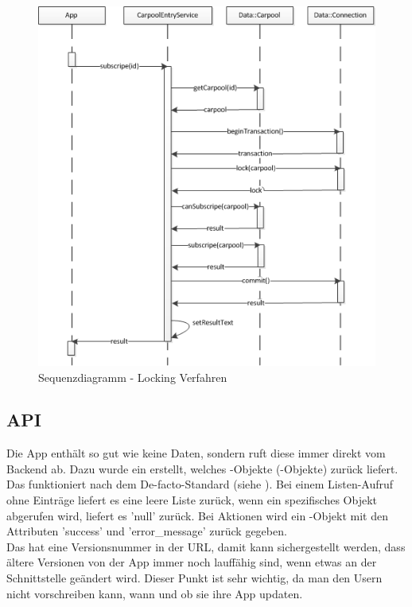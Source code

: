 \begin{figure}[h]
\centering
\includegraphics[scale=0.75]{images/visio/locking_verfahren.png}
\caption{Sequenzdiagramm - Locking Verfahren}
\label{fig:locking_verfahren}
\end{figure}

\FloatBarrier
\subsection{API}
Die App enthält so gut wie keine Daten, sondern ruft diese immer direkt vom Backend ab. Dazu wurde ein   erstellt, welches -Objekte (-Objekte) zurück liefert. Das  funktioniert nach dem De-facto-Standard (siehe \cite{wiki_restful}). Bei einem Listen-Aufruf ohne Einträge liefert es eine leere Liste zurück, wenn ein spezifisches Objekt abgerufen wird, liefert es 'null' zurück. Bei Aktionen wird ein -Objekt mit den Attributen 'success' und 'error\_message' zurück gegeben.\\

Das  hat eine Versionsnummer in der URL, damit kann sichergestellt werden, dass ältere Versionen von der App immer noch lauffähig sind, wenn etwas an der Schnittstelle geändert wird. Dieser Punkt ist sehr wichtig, da man den Usern nicht vorschreiben kann, wann und ob sie ihre App updaten.


